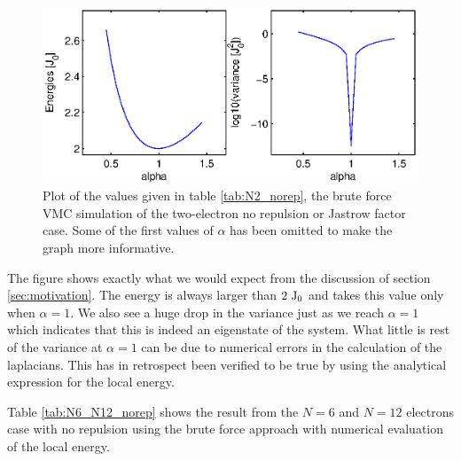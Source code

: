 \begin{figure}[h!]
	\centering 	
	\includegraphics[width=\textwidth]{results/N2_norep.eps}
	\caption{Plot of the values given in table \ref{tab:N2_norep}, the brute force VMC simulation of the two-electron no repulsion or Jastrow factor case. 
	Some of the first values of $\alpha$ has been omitted to make the graph more informative.}
	\label{fig:N2_norep}
\end{figure}

The figure shows exactly what we would expect from the discussion of section \ref{sec:motivation}. 
The energy is always larger than $2 ~\textrm{J}_0$ and takes this value only when $\alpha = 1$. 
We also see a huge drop in the variance just as we reach $\alpha = 1$ which indicates that this is indeed an eigenstate of the system.
What little is rest of the variance at $\alpha=1$ can be due to numerical errors in the calculation of the laplacians. 
This has in retrospect been verified to be true by using the analytical expression for the local energy. 

Table \ref{tab:N6_N12_norep} shows the result from the $N=6$ and $N=12$ electrons case with no repulsion using the brute force approach with numerical evaluation of the local energy.

